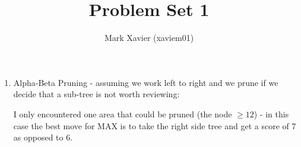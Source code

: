 \documentclass{article}
\title{Problem Set 1}
\author{Mark Xavier (xaviem01)}
\begin{document}
	
	\maketitle
	
	\begin{enumerate}
		\item Alpha-Beta Pruning - assuming we work left to right and we prune if we decide that a sub-tree is not worth reviewing:
		
		\begin{center}
		\end{center}
	
		I only encountered one area that could be pruned (the node $\geq 12$) - in this case the best move for MAX is to take the right side tree and get a score of 7 as opposed to 6.
	
	\end{enumerate}
	
\end{document}
